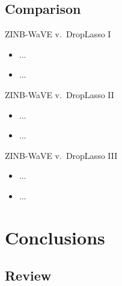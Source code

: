 \documentclass{beamer}
\begin{document}
\subsection{Comparison}

\begin{frame}{ZINB-WaVE v.~DropLasso I}

\begin{itemize}
  \itemsep10pt
  \item ...
  \item ...
\end{itemize}

\end{frame}


\begin{frame}{ZINB-WaVE v.~DropLasso II}

\begin{itemize}
  \itemsep10pt
  \item ...
  \item ...
\end{itemize}

\end{frame}


\begin{frame}{ZINB-WaVE v.~DropLasso III}

\begin{itemize}
  \itemsep10pt
  \item ...
  \item ...
\end{itemize}

\end{frame}

\section{Conclusions}
\subsection{Review}
\end{document}
